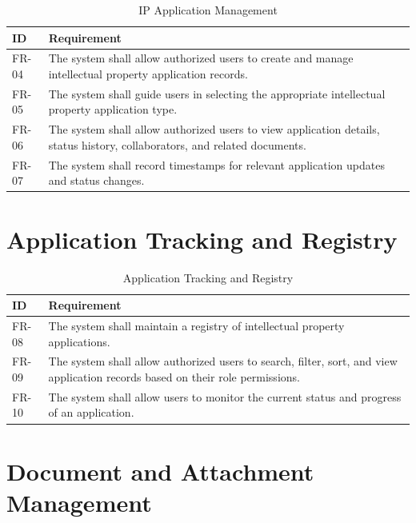 \begin{table}[H]
\centering
\small
\caption{IP Application Management}
\label{tab:fr_application_management}
\begin{tabular}{|p{2.2cm}|p{12cm}|}
\hline
\textbf{ID} & \textbf{Requirement} \\
\hline
FR-04 & The system shall allow authorized users to create and manage intellectual property application records. \\
\hline
FR-05 & The system shall guide users in selecting the appropriate intellectual property application type. \\
\hline
FR-06 & The system shall allow authorized users to view application details, status history, collaborators, and related documents. \\
\hline
FR-07 & The system shall record timestamps for relevant application updates and status changes. \\
\hline
\end{tabular}
\end{table}

\section{Application Tracking and Registry}

\begin{table}[H]
\centering
\small
\caption{Application Tracking and Registry}
\label{tab:fr_tracking_registry}
\begin{tabular}{|p{2.2cm}|p{12cm}|}
\hline
\textbf{ID} & \textbf{Requirement} \\
\hline
FR-08 & The system shall maintain a registry of intellectual property applications. \\
\hline
FR-09 & The system shall allow authorized users to search, filter, sort, and view application records based on their role permissions. \\
\hline
FR-10 & The system shall allow users to monitor the current status and progress of an application. \\
\hline
\end{tabular}
\end{table}

\section{Document and Attachment Management}

